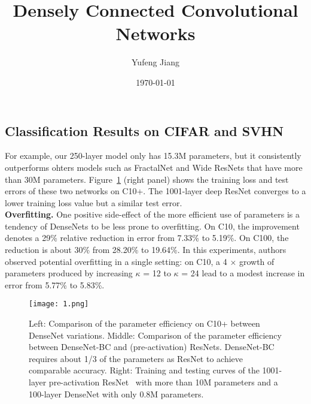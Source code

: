 \documentclass[10pt,letterpaper]{article}
\title{Densely Connected Convolutional Networks}
\author{Yufeng Jiang}
\date{\today}
\begin{document}
\maketitle
\balance
\begin{multicols}{2}
\section{Classification Results on CIFAR and SVHN}
For example, our 250-layer model only has 15.3M parameters, but it consistently outperforms ohters models such as FractalNet and Wide ResNets that have more than 30M parameters. Figure~\ref{fig} (right panel) shows the training loss and test errors of these two networks on C10+. The 1001-layer deep ResNet converges to a lower training loss value but a similar test error.\\
{\bf Overfitting.} One positive side-effect of the more efficient use of parameters is a tendency of DenseNets to be less prone to overfitting. On C10, the improvement denotes a 29\% relative reduction in error from 7.33\% to 5.19\%. On C100, the reduction is about 30\% from 28.20\% to 19.64\%. In this experiments, authors observed potential overfitting in a single setting: on C10, a 4 $\times$ growth of parameters produced by increasing $\kappa$ = 12 to $\kappa$ = 24 lead to a modest increase in error from 5.77\% to 5.83\%. \\ 
\end{multicols}
\begin{figure}[htbp]
\begin{center}
\texttt{[image: 1.png]}
\caption{Left: Comparison of the parameter efficiency on C10+ between DenseNet variations. Middle: Comparison of the parameter efficiency between DenseNet-BC and (pre-activation) ResNets. DenseNet-BC requires about 1/3 of the parameters as ResNet to achieve comparable accuracy. Right: Training and testing curves of the 1001-layer pre-activation ResNet~\cite{Identity} with more than 10M parameters and a 100-layer DenseNet with only 0.8M parameters.}
\label{fig}
\end{center}
\end{figure}
\end{document}
